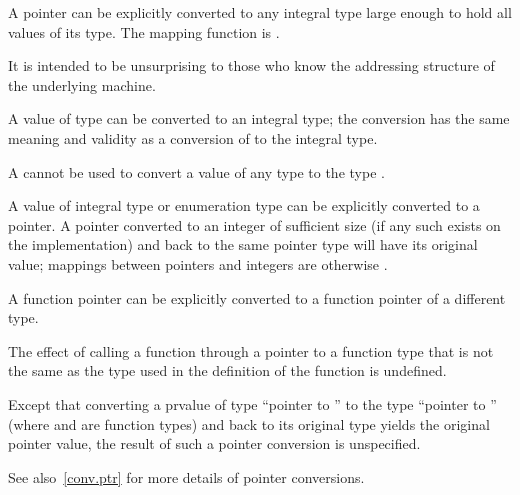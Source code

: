 \pnum
{}%
%
A pointer can be explicitly converted to any integral type large enough
to hold all values of its type.
%
The mapping function is .
\begin{note}
It is intended to be unsurprising to those who know the addressing
structure of the underlying machine.
\end{note}
A value of type  can be converted to an integral
type; the conversion has the same meaning and validity as a conversion of
 to the integral type.
\begin{note}
A 
cannot be used to convert a value of any type to the type
.
\end{note}

\pnum
{}%
%
A value of integral type or enumeration type can be explicitly converted
to a pointer. A pointer converted to an integer of sufficient size (if
any such exists on the implementation) and back to the same pointer type
will have its original value;
%
mappings between pointers and integers are otherwise
.

\pnum
{}%
%
%
A function pointer can be explicitly converted
to a function pointer of a different type.
%
\begin{note}
The effect of calling a function through a pointer to a function
type that is not the same as the type used in the
definition of the function is undefined.
\end{note}
Except that converting
a prvalue of type ``pointer to '' to the type ``pointer to
'' (where  and  are function types) and
back to its original type yields the original pointer value, the result
of such a pointer conversion is unspecified.
\begin{note}
See also~\ref{conv.ptr} for more details of pointer conversions.
\end{note}

